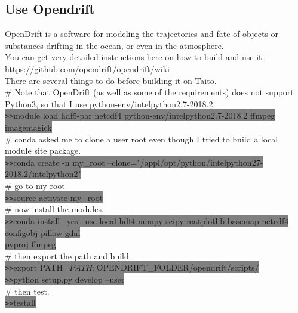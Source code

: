 \documentclass[11pt]{article}
\begin{document}
\subsection{Use Opendrift}
OpenDrift is a software for modeling the trajectories and fate of objects or substances drifting in the ocean, or even in the atmosphere.\\
You can get very detailed instructions here on how to build and use it:\\
\url{https://github.com/opendrift/opendrift/wiki}\\
There are several things to do before building it on Taito.\\
\# Note that OpenDrift (as well as some of the requirements) does not support Python3, so that I use python-env/intelpython2.7-2018.2\\
\colorbox{Grey}{\texttt{>>}module load hdf5-par netcdf4 python-env/intelpython2.7-2018.2 ffmpeg imagemagick}\\
\# conda asked me to clone a user root even though I tried to build a local module site package.\\
\colorbox{Grey}{\texttt{>>}conda create -n my\_root --clone="/appl/opt/python/intelpython27-2018.2/intelpython2"}\\
\# go to my root\\
\colorbox{Grey}{\texttt{>>}source activate my\_root}\\
\# now install the modules.\\ 
\colorbox{Grey}{\texttt{>>}conda install --yes --use-local hdf4 numpy scipy matplotlib basemap netcdf4 configobj pillow gdal}\\
\colorbox{Grey}{pyproj ffmpeg}\\
\# then export the path and build.\\
\colorbox{Grey}{\texttt{>>}export PATH=$PATH:$OPENDRIFT\_FOLDER/opendrift/scripts/}\\
\colorbox{Grey}{\texttt{>>}python setup.py develop --user}\\
\# then test.\\
\colorbox{Grey}{\texttt{>>}testall}\\
\end{document}
